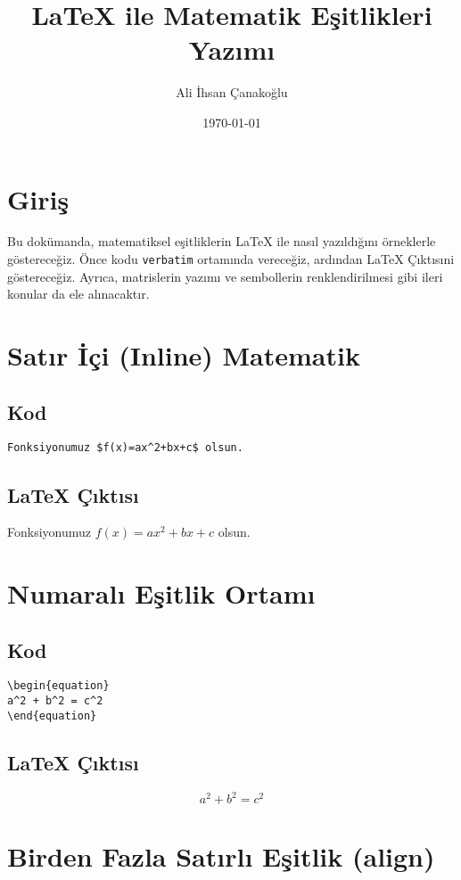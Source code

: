 \documentclass[a4paper,12pt]{article}
\title{\LaTeX{} ile Matematik Eşitlikleri Yazımı}
\author{Ali İhsan Çanakoğlu}
\date{\today}
\begin{document}
\maketitle

\section{Giriş}
Bu dokümanda, matematiksel eşitliklerin \LaTeX{} ile nasıl yazıldığını örneklerle göstereceğiz.
Önce kodu \texttt{verbatim} ortamında vereceğiz, ardından \LaTeX{} Çıktısıni göstereceğiz.
Ayrıca, matrislerin yazımı ve sembollerin renklendirilmesi gibi ileri konular da ele alınacaktır.

\section{Satır İçi (Inline) Matematik}
\subsection{Kod}
\begin{verbatim}
Fonksiyonumuz $f(x)=ax^2+bx+c$ olsun.
\end{verbatim}

\subsection{\LaTeX{} Çıktısı}
Fonksiyonumuz $f(x)=ax^2+bx+c$ olsun.

\section{Numaralı Eşitlik Ortamı}
\subsection{Kod}
\begin{verbatim}
\begin{equation}
a^2 + b^2 = c^2
\end{equation}
\end{verbatim}

\subsection{\LaTeX{} Çıktısı}
\begin{equation}
a^2 + b^2 = c^2
\end{equation}

\section{Birden Fazla Satırlı Eşitlik (align)}
\end{document}
